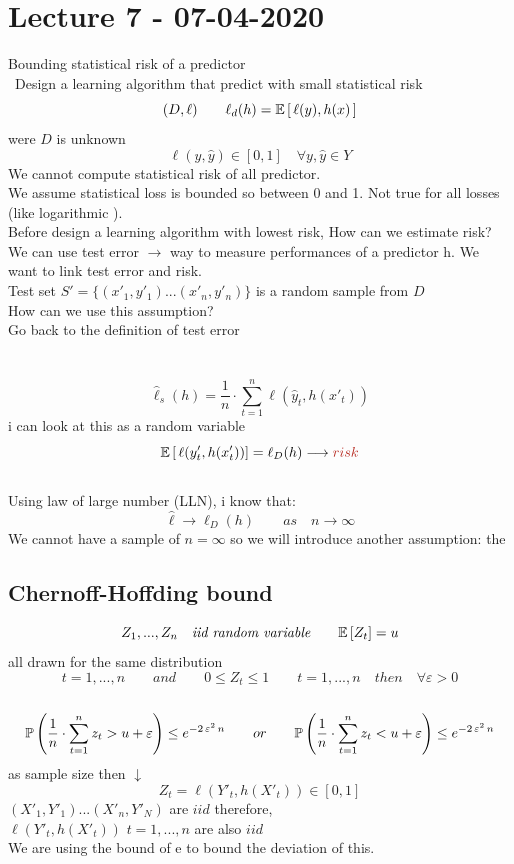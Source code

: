 \documentclass[../main.tex]{subfiles}
\begin{document}
\chapter{Lecture 7 - 07-04-2020}
Bounding statistical risk of a predictor\\\
Design a learning algorithm that predict with small statistical risk\\
$$
(D,\ell) \qquad \ell_d(h) = \mathbb{E}\left[ \, \ell (y), h(x) \, \right]
$$
were $D$ is unknown
$$
\ell(y, \hat{y}) \in [0,1] \quad \forall y, \hat{y} \in Y
$$
We cannot compute statistical risk of all predictor.\\
We assume statistical loss is bounded so between 0 and 1. Not true for all
losses (like logarithmic ).\\
Before design a learning algorithm with lowest risk, How can we estimate
risk?\\
We can use test error $\rightarrow$ way to measure performances of a predictor h.
We want to link test error and risk.
\\
Test set $S' = \{ (x'_1, y'_1) ...(x'_n,y'_n) \}$ is a random sample from $D$
\\
How can we use this assumption?\\
Go back to the definition of test error\\
\\
\\
$$
\hat{\ell}_s(h) = \frac{1}{n} \cdot \sum_{t=1}^{n} \ell (\hat{y}_t,h(x'_t))
$$
i can look at this as a random variable
\\
$$
\barra{E} \left[ \, \ell (y'_t, h(x'_t)) \right] = \ell_D(h) \longrightarrow \red{risk}
$$\\
Using law of large number (LLN), i know that:
$$
\hat{\ell} \longrightarrow \ell_D(h) \qquad as \quad n \rightarrow \infty
$$
We cannot have a sample of $n = \infty$ so we will introduce another assumption:
the \red{Chernoff-Hoffding bound}

\section{Chernoff-Hoffding bound}
$$
Z_1,...,Z_n \quad \textit{iid random variable} \qquad \mathbb{E}\left[Z_t \right] = u
$$
all drawn for the same distribution 
\\
$$
t = 1, ..., n \qquad and \qquad 0 \leq Z_t \leq 1 \qquad t = 1,...,n \quad then \quad \forall \varepsilon > 0
$$\
$$
\mathbb{P} \left( \frac{1}{n} \cdot \sum_{t=1}^{n} z_t > u + \varepsilon \right) \leq e^{-2 \, \varepsilon^2 \, n} \qquad  or \qquad \mathbb{P} \left( \frac{1}{n} \cdot \sum_{t=1}^{n} z_t < u + \varepsilon \right) \leq e^{-2 \, \varepsilon^2 \, n}
$$
as sample size then $\downarrow$
$$
Z_t = \ell(Y'_t, h(X'_t)) \in \left[0,1\right]
$$
$
(X'_1, Y'_1)...(X'_n, Y'_N)$ are $iid$ therefore, \\ $\ell\left(Y'_t, h\left(X'_t\right)\right)$ \quad $t = 1,...,n $ \quad are also $iid$
\\
We are using the bound of e to bound the deviation of this.
\end{document}
